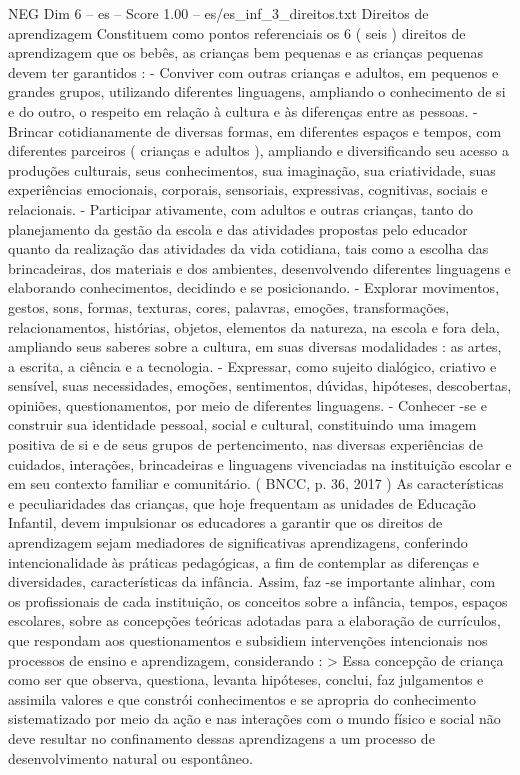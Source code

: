 \begin{textsample}{NEG Dim 6 – es – Score 1.00 – es/es\_inf\_3\_direitos.txt}  \label{ex:f6_neg_147}
Direitos de aprendizagem Constituem como pontos referenciais os 6 ( seis ) direitos de aprendizagem que os bebês, as crianças bem pequenas e as crianças pequenas devem ter garantidos : - Conviver com outras crianças e adultos, em pequenos e grandes grupos, utilizando diferentes linguagens, ampliando o conhecimento de si e do outro, o respeito em relação à cultura e às diferenças entre as pessoas. - Brincar cotidianamente de diversas formas, em diferentes espaços e tempos, com diferentes parceiros ( crianças e adultos ), ampliando e diversificando seu acesso a produções culturais, seus conhecimentos, sua imaginação, sua criatividade, suas experiências emocionais, corporais, sensoriais, expressivas, cognitivas, sociais e relacionais. - Participar ativamente, com adultos e outras crianças, tanto do planejamento da gestão da escola e das atividades propostas pelo educador quanto da realização das atividades da vida cotidiana, tais como a escolha das brincadeiras, dos materiais e dos ambientes, desenvolvendo diferentes linguagens e elaborando conhecimentos, decidindo e se posicionando. - Explorar movimentos, gestos, sons, formas, texturas, cores, palavras, emoções, transformações, relacionamentos, histórias, objetos, elementos da natureza, na escola e fora dela, ampliando seus saberes sobre a cultura, em suas diversas modalidades : as artes, a escrita, a ciência e a tecnologia. - Expressar, como sujeito dialógico, criativo e sensível, suas necessidades, emoções, sentimentos, dúvidas, hipóteses, descobertas, opiniões, questionamentos, por meio de diferentes linguagens. - Conhecer -se e construir sua identidade pessoal, social e cultural, constituindo uma imagem positiva de si e de seus grupos de pertencimento, nas diversas experiências de cuidados, interações, brincadeiras e linguagens vivenciadas na instituição escolar e em seu contexto familiar e comunitário. ( BNCC, p. 36, 2017 ) As características e peculiaridades das crianças, que hoje frequentam as unidades de Educação Infantil, devem impulsionar os educadores a garantir que os direitos de aprendizagem sejam mediadores de significativas aprendizagens, conferindo intencionalidade às práticas pedagógicas, a fim de contemplar as diferenças e diversidades, características da infância.
Assim, faz -se importante alinhar, com os profissionais de cada instituição, os conceitos sobre a infância, tempos, espaços escolares, sobre as concepções teóricas adotadas para a elaboração de currículos, que respondam aos questionamentos e subsidiem intervenções intencionais nos processos de ensino e aprendizagem, considerando : > Essa concepção de criança como ser que observa, questiona, levanta hipóteses, conclui, faz julgamentos e assimila valores e que constrói conhecimentos e se apropria do conhecimento sistematizado por meio da ação e nas interações com o mundo físico e social não deve resultar no confinamento dessas aprendizagens a um processo de desenvolvimento natural ou espontâneo.

\end{textsample}
